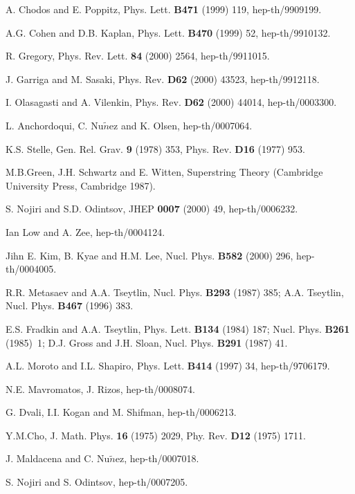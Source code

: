 \documentclass[a4paper,12pt]{article}
\begin{document}
\begin{thebibliography}{99}
 A. Chodos and E. Poppitz, Phys. Lett. {\bf B471} (1999) 119, 
hep-th/9909199.

 A.G. Cohen and D.B. Kaplan, Phys. Lett. {\bf B470} (1999) 52, 
hep-th/9910132.

 R. Gregory, Phys. Rev. Lett. {\bf 84} (2000) 2564, 
hep-th/9911015.

 J. Garriga and M. Sasaki, Phys. Rev. {\bf D62} (2000) 43523, 
hep-th/9912118.

 I. Olasagasti and A. Vilenkin, Phys. Rev. {\bf D62} 
(2000) 44014, hep-th/0003300.


 L. Anchordoqui, C. Nu$\tilde{n}$ez and K. Olsen, 
hep-th/0007064.  

 K.S. Stelle, Gen. Rel. Grav. {\bf 9} (1978) 353, Phys. Rev. 
{\bf D16} (1977) 953.

 M.B.Green, J.H. Schwartz and E. Witten, Superstring Theory 
(Cambridge University Press, Cambridge 1987).

 S. Nojiri and S.D. Odintsov, JHEP {\bf 0007} (2000) 49, 
hep-th/0006232.

 Ian Low and A. Zee, hep-th/0004124.

 Jihn E. Kim, B. Kyae and H.M. Lee, Nucl. Phys. {\bf B582} 
(2000) 296, hep-th/0004005.

 R.R. Metasaev and A.A. Tseytlin, Nucl. Phys. {\bf B293} 
(1987) 385; A.A. Tseytlin, Nucl. Phys. {\bf B467} (1996) 383.

 E.S. Fradkin and A.A. Tseytlin, Phys. Lett. {\bf B134} (1984) 
187; Nucl. Phys. {\bf B261} 
(1985)~1; D.J. Gross and J.H. Sloan, Nucl. Phys. {\bf B291} (1987) 41.

 A.L. Moroto and I.L. Shapiro, Phys. Lett. {\bf B414} (1997) 34, 
hep-th/9706179.

 N.E. Mavromatos, J. Rizos, hep-th/0008074. 

 G. Dvali, I.I. Kogan and M. Shifman, hep-th/0006213.

 Y.M.Cho, J. Math. Phys. {\bf 16} (1975) 2029, Phy. Rev. 
{\bf D12} (1975) 1711.

 J. Maldacena and C. Nu$\tilde{n}$ez, hep-th/0007018.

 S. Nojiri and S. Odintsov, hep-th/0007205.

\end{thebibliography}
\end{document}
